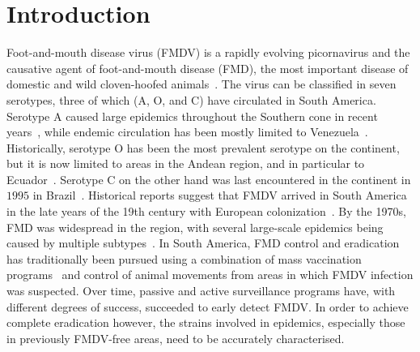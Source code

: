 \documentclass[10pt]{article}
\begin{document}
\section*{Introduction}

Foot-and-mouth disease virus (FMDV) is a rapidly evolving picornavirus and the causative agent of foot-and-mouth disease (FMD), the most important disease of domestic and wild cloven-hoofed animals~\cite{review}.
The virus can be classified in seven serotypes, three of which (A, O, and C) have circulated in South America.
Serotype A caused large epidemics throughout the Southern cone in recent years~\cite{Perez2001, Malirat2012}, while endemic circulation has been mostly limited to Venezuela~\cite{Malirat2012}.
Historically, serotype O has been the most prevalent serotype on the continent, but it is now limited to areas in the Andean region, and in particular to Ecuador~\cite{andean}.
Serotype C on the other hand was last encountered in the continent in $1995$ in Brazil~\cite{review_eradication}.
Historical reports suggest that FMDV arrived in South America in the late years of the 19th century with European colonization~\cite{Naranjo2013, tully}. 
By the 1970s, FMD was widespread in the region, with several large-scale epidemics being caused by multiple subtypes~\cite{Saraiva2003}.%
In South America, FMD control and eradication has traditionally been pursued using a combination of mass vaccination programs~\cite{vaccinationSA} and control of animal movements from areas in which FMDV infection was suspected.
Over time, passive and active surveillance programs have, with different degrees of success, succeeded to early detect FMDV.
In order to achieve complete eradication however, the strains involved in epidemics, especially those in previously FMDV-free areas, need to be accurately characterised.
\end{document}
